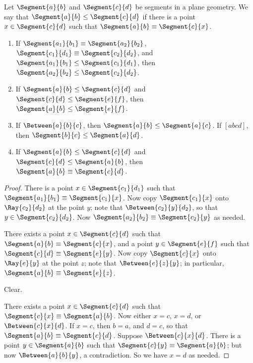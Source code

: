 \documentclass{article}
\begin{document}
\begin{dfn}
Let $\Segment{a}{b}$ and $\Segment{c}{d}$ be segments in a plane geometry. We say that $\Segment{a}{b} \leq \Segment{c}{d}$ if there is a point $x \in \Segment{c}{d}$ such that $\Segment{a}{b} \equiv \Segment{c}{x}$.
\end{dfn}

\begin{prop} \mbox{}
\begin{enumerate}
\item If $\Segment{a_1}{b_1} \equiv \Segment{a_2}{b_2}$, $\Segment{c_1}{d_1} \equiv \Segment{c_2}{d_2}$, and $\Segment{a_1}{b_1} \leq \Segment{c_1}{d_1}$, then $\Segment{a_2}{b_2} \leq \Segment{c_2}{d_2}$.
\item If $\Segment{a}{b} \leq \Segment{c}{d}$ and $\Segment{c}{d} \leq \Segment{e}{f}$, then $\Segment{a}{b} \leq \Segment{e}{f}$.
\item If $\Between{a}{b}{c}$, then $\Segment{a}{b} \leq \Segment{a}{c}$. If $[abcd]$, then $\Segment{b}{c} \leq \Segment{a}{d}$.
\item If $\Segment{a}{b} \leq \Segment{c}{d}$ and $\Segment{c}{d} \leq \Segment{a}{b}$, then $\Segment{a}{b} \equiv \Segment{c}{d}$.
\end{enumerate}
\end{prop}

\begin{proof}
\item There is a point $x \in \Segment{c_1}{d_1}$ such that $\Segment{a_1}{b_1} \equiv \Segment{c_1}{x}$. Now copy $\Segment{c_1}{x}$ onto $\Ray{c_2}{d_2}$ at the point $y$; note that $\Between{c_2}{y}{d_2}$, so that $y \in \Segment{c_2}{d_2}$. Now $\Segment{a_2}{b_2} \equiv \Segment{c_2}{y}$ as needed.

\item There exists a point $x \in \Segment{c}{d}$ such that $\Segment{a}{b} \equiv \Segment{c}{x}$, and a point $y \in \Segment{e}{f}$ such that $\Segment{c}{d} \equiv \Segment{e}{y}$. Now copy $\Segment{c}{x}$ onto $\Ray{e}{y}$ at the point $z$; note that $\Between{e}{z}{y}$; in particular, $\Segment{a}{b} \equiv \Segment{e}{z}$.

\item Clear.

\item There exists a point $x \in \Segment{c}{d}$ such that $\Segment{c}{x} \equiv \Segment{a}{b}$. Now either $x = c$, $x = d$, or $\Between{c}{x}{d}$. If $x = c$, then $b = a$, and $d = c$, so that $\Segment{a}{b} \equiv \Segment{c}{d}$. Suppose $\Between{c}{x}{d}$. There is a point $y \in \Segment{a}{b}$ such that $\Segment{c}{y} \equiv \Segment{a}{b}$; but now $\Between{a}{b}{y}$, a contradiction. So we have $x = d$ as needed.
\end{proof}
\end{document}
